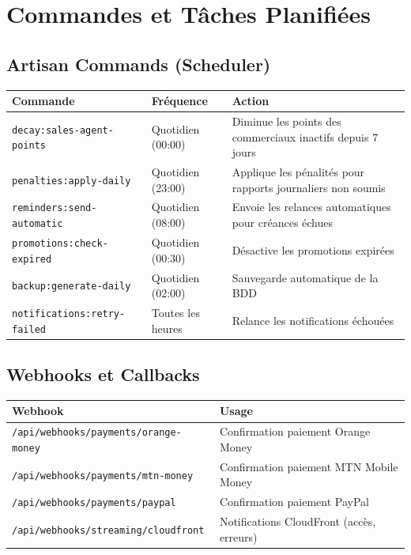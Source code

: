 \documentclass[12pt,a4paper]{report}
\begin{document}
\chapter{Commandes et Tâches Planifiées}

\section{Artisan Commands (Scheduler)}

\begin{longtable}{L{5cm} L{3cm} L{6cm}}
    \toprule
    \textbf{Commande} & \textbf{Fréquence} & \textbf{Action} \\
    \midrule
    \endhead
    \texttt{decay:sales-agent-points} & Quotidien (00:00) & Diminue les points des commerciaux inactifs depuis 7 jours \\
    \texttt{penalties:apply-daily} & Quotidien (23:00) & Applique les pénalités pour rapports journaliers non soumis \\
    \texttt{reminders:send-automatic} & Quotidien (08:00) & Envoie les relances automatiques pour créances échues \\
    \texttt{promotions:check-expired} & Quotidien (00:30) & Désactive les promotions expirées \\
    \texttt{backup:generate-daily} & Quotidien (02:00) & Sauvegarde automatique de la BDD \\
    \texttt{notifications:retry-failed} & Toutes les heures & Relance les notifications échouées \\
    \bottomrule
\end{longtable}

\section{Webhooks et Callbacks}

\begin{tabularx}{\textwidth}{l X}
    \toprule
    \textbf{Webhook} & \textbf{Usage} \\
    \midrule
    \texttt{/api/webhooks/payments/orange-money} & Confirmation paiement Orange Money \\
    \texttt{/api/webhooks/payments/mtn-money} & Confirmation paiement MTN Mobile Money \\
    \texttt{/api/webhooks/payments/paypal} & Confirmation paiement PayPal \\
    \texttt{/api/webhooks/streaming/cloudfront} & Notifications CloudFront (accès, erreurs) \\
    \bottomrule
\end{tabularx}
\end{document}
